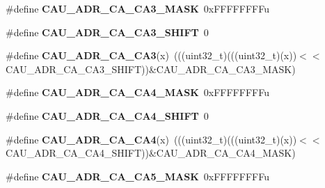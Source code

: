 \begin{DoxyCompactItemize}
\item 
\#define {\bfseries C\+A\+U\+\_\+\+A\+D\+R\+\_\+\+C\+A\+\_\+\+C\+A3\+\_\+\+M\+A\+SK}~0x\+F\+F\+F\+F\+F\+F\+F\+Fu\hypertarget{group__CAU__Register__Masks_ga32fe7c3ce489038db5a7614ff6c376d2}{}\label{group__CAU__Register__Masks_ga32fe7c3ce489038db5a7614ff6c376d2}

\item 
\#define {\bfseries C\+A\+U\+\_\+\+A\+D\+R\+\_\+\+C\+A\+\_\+\+C\+A3\+\_\+\+S\+H\+I\+FT}~0\hypertarget{group__CAU__Register__Masks_ga93cb8cfd1a5fb49e223ca89c7c821ab5}{}\label{group__CAU__Register__Masks_ga93cb8cfd1a5fb49e223ca89c7c821ab5}

\item 
\#define {\bfseries C\+A\+U\+\_\+\+A\+D\+R\+\_\+\+C\+A\+\_\+\+C\+A3}(x)~(((uint32\+\_\+t)(((uint32\+\_\+t)(x))$<$$<$C\+A\+U\+\_\+\+A\+D\+R\+\_\+\+C\+A\+\_\+\+C\+A3\+\_\+\+S\+H\+I\+FT))\&C\+A\+U\+\_\+\+A\+D\+R\+\_\+\+C\+A\+\_\+\+C\+A3\+\_\+\+M\+A\+SK)\hypertarget{group__CAU__Register__Masks_gacbf10f24a67b200c72e1b7101efa6f6b}{}\label{group__CAU__Register__Masks_gacbf10f24a67b200c72e1b7101efa6f6b}

\item 
\#define {\bfseries C\+A\+U\+\_\+\+A\+D\+R\+\_\+\+C\+A\+\_\+\+C\+A4\+\_\+\+M\+A\+SK}~0x\+F\+F\+F\+F\+F\+F\+F\+Fu\hypertarget{group__CAU__Register__Masks_ga2ed9f31c68a09dba5db3b3e10836f3e6}{}\label{group__CAU__Register__Masks_ga2ed9f31c68a09dba5db3b3e10836f3e6}

\item 
\#define {\bfseries C\+A\+U\+\_\+\+A\+D\+R\+\_\+\+C\+A\+\_\+\+C\+A4\+\_\+\+S\+H\+I\+FT}~0\hypertarget{group__CAU__Register__Masks_gacd7b74188dccfc62f26f78229fb8a766}{}\label{group__CAU__Register__Masks_gacd7b74188dccfc62f26f78229fb8a766}

\item 
\#define {\bfseries C\+A\+U\+\_\+\+A\+D\+R\+\_\+\+C\+A\+\_\+\+C\+A4}(x)~(((uint32\+\_\+t)(((uint32\+\_\+t)(x))$<$$<$C\+A\+U\+\_\+\+A\+D\+R\+\_\+\+C\+A\+\_\+\+C\+A4\+\_\+\+S\+H\+I\+FT))\&C\+A\+U\+\_\+\+A\+D\+R\+\_\+\+C\+A\+\_\+\+C\+A4\+\_\+\+M\+A\+SK)\hypertarget{group__CAU__Register__Masks_gad525508bdc2b57937df37b9ae1d49017}{}\label{group__CAU__Register__Masks_gad525508bdc2b57937df37b9ae1d49017}

\item 
\#define {\bfseries C\+A\+U\+\_\+\+A\+D\+R\+\_\+\+C\+A\+\_\+\+C\+A5\+\_\+\+M\+A\+SK}~0x\+F\+F\+F\+F\+F\+F\+F\+Fu\hypertarget{group__CAU__Register__Masks_ga75b64822c5faed17c8032081d5ba9de7}{}\label{group__CAU__Register__Masks_ga75b64822c5faed17c8032081d5ba9de7}


\end{DoxyCompactItemize}
